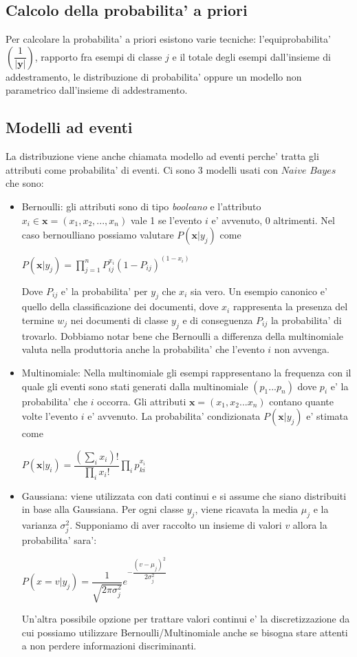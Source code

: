 \subsection*{Calcolo della probabilita' a priori}
  Per calcolare la probabilita' a priori esistono varie tecniche: l'equiprobabilita' $\left(\dfrac{1}{|\textbf{y}|}\right)$, rapporto fra esempi di classe $j$ e il totale degli esempi dall'insieme di addestramento, le distribuzione di probabilita' oppure un modello non parametrico dall'insieme di addestramento.
  
\subsection*{Modelli ad eventi}  
   La distribuzione viene anche chiamata modello ad eventi perche' tratta gli attributi come probabilita' di eventi. Ci sono 3 modelli usati con $\textit{Naive Bayes}$ che sono:
\begin{itemize}
	\item Bernoulli: gli attributi sono di tipo \textit{booleano} e l'attributo $x_i \in \textbf{x}=(x_1,x_2,...,x_n)$ vale 1 se l'evento $i$ e' avvenuto, 0 altrimenti. Nel caso bernoulliano possiamo valutare $P(\textbf{x}|y_j)$ come
	\begin{center}
	 $P(\textbf{x}|y_j) = \prod_{j=1}^{n} P_{ij}^{x_i} (1-P_{ij})^{(1-x_i)}$
	\end{center}
	Dove $P_{ij}$ e' la probabilita' per $y_j$ che $x_i$ sia vero. Un esempio canonico e' quello della classificazione dei documenti, dove $x_i$ rappresenta la presenza del termine $w_j$ nei documenti di classe $y_j$ e di conseguenza $P_{ij}$ la probabilita' di trovarlo. Dobbiamo notar bene che Bernoulli a differenza della multinomiale valuta nella produttoria anche la probabilita' che l'evento $i$ non avvenga.
	

	\item Multinomiale: Nella multinomiale gli esempi rappresentano la frequenza con il quale gli eventi sono stati generati dalla multinomiale $(p_1...p_n)$ dove $p_i$ e' la probabilita' che $i$ occorra. Gli attributi $\textbf{x}=(x_1,x_2...x_n)$ contano quante volte l'evento $i$ e' avvenuto. La probabilita' condizionata  $P(\textbf{x}|y_j)$ e' stimata come
	\begin{center}
		$P(\textbf{x}|y_i) = \dfrac{(\sum_{i}x_i)!}{\prod_{i}x_i!}\prod_i p_{ki}^{x_i}$
	\end{center}
	\item Gaussiana: viene utilizzata con dati continui e si assume che siano distribuiti in base alla Gaussiana. Per ogni classe $y_j$, viene ricavata la media $\mu_j$ e la varianza $\sigma_{j}^{2}$. Supponiamo di aver raccolto un insieme di valori $v$ allora la probabilita' sara':
	\begin{center}
		$P(x =v | y_j) = \dfrac{1}{\sqrt{2 \pi \sigma_{j}^2}} e^{-\dfrac{(v - \mu_j)^2}{2 \sigma_{j}^2}}$
	\end{center}
	Un'altra possibile opzione per trattare valori continui e' la discretizzazione da cui possiamo utilizzare Bernoulli/Multinomiale anche se bisogna stare attenti a non perdere informazioni discriminanti.
\end{itemize}

